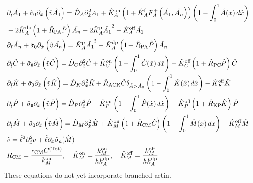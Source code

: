 \documentclass[11pt]{article}
\newcommand{\6}[1]{#1_{\text{6}}}
\newcommand{\3}[1]{#1_{\text{3}}}
\newcommand{\Tot}[1]{#1^\text{(Tot)}}
\newcommand{\A}[1]{#1_A}
\newcommand{\My}[1]{#1_M}
\begin{document}
\begin{subequations}
\label{eq:Everything}
\begin{align}
\nonumber
&\Dthat \hat{\MA}  +\hat{\sigma}_0  \Dxhat \left(\hat{v} \hat{\MA} \right) = \DhatA \Dxhat^2 \MA +\KhatonA \left(1+\KhatfA \A{F}^+\left(\hat{\MA},\hat{\PA}\right)\right)\left(1 - \int_0^1 \hat{A}(x) \, d\hat{x} \right) \\ 
&+ 2\KhatdpA \left(1+\hat{R}_\text{PA}\hat{P}\right)\hat{\PA}-2\KhatpA \hat{\MA}^2 - \KhatoffA \hat{\MA} \\ 
&\Dthat \hat{\PA}+\hat{\sigma}_0  \Dxhat \left(\hat{v} \hat{\PA} \right)  =\KhatpA \hat{\MA}^2- \KhatdpA \left(1+\hat{R}_\text{PA}\hat{P}\right) \hat{\PA} \\ 
&\Dthat \hat{C}+\hat{\sigma}_0  \Dxhat \left(\hat{v} \hat{C} \right)  =\DhatC \Dxhat^2 \hat{C} +\KhatonC \left(1 - \int_0^1 \hat{C}(\hat x) \, d\hat{x} \right)  - \KhatoffC \left(1+\hat{R}_\text{PC}\hat P\right)\hat{C}\\
&\Dthat \hat{K} +\hat{\sigma}_0  \Dxhat \left(\hat{v} \hat{K} \right) = \DhatK \Dxhat^2 \hat{K} + \hat{R}_\text{ACK} \hat{C} \delta_{\hat A > \hat A_0} \left(1 - \int_0^1 \hat{K}(\hat x) \, d\hat{x} \right)-\KhatoffK \hat{K} \\
&\Dthat \hat{P} +\hat{\sigma}_0  \Dxhat \left(\hat{v} \hat{P} \right)  =\DhatP \Dxhat^2 \hat{P} +\KhatonP \left(1 - \int_0^1 \hat{P}(\hat x) \, d\hat{x} \right)  - \KhatoffP \left(1+\hat{R}_\text{KP}\hat{K}\right)\hat{P}\\
&\Dthat \hat{M} +\hat{\sigma}_0  \Dxhat \left(\hat{v} \hat{M} \right) =\hat{D}_M \Dxhat^2 \hat{M} +\KhatonM \left(1+\hat{R}_\text{CM} \hat C\right) \left(1-\int_0^1  \hat{M}(x) \, dx\right)- \KhatoffM \hat{M}\\
&\hat{v} = \hat{\ell}^2 \Dxhat^2 v +\hat{\ell} \Dxhat \hat{\sigma}_a(\hat{M})\\
\label{eq:NewNDs}
&R_\text{CM}=\frac{r_\text{CM}\Tot{C}}{\kon_M},\quad \hat{K}^\text{on}_M= \frac{\My{\kon}}{h \kdp_A}, \quad \hat{K}^\text{off}_M= \frac{\My{\koff}}{h \kdp_A}
\end{align}
\end{subequations}
These equations do not yet incorporate branched actin.
\end{document}
